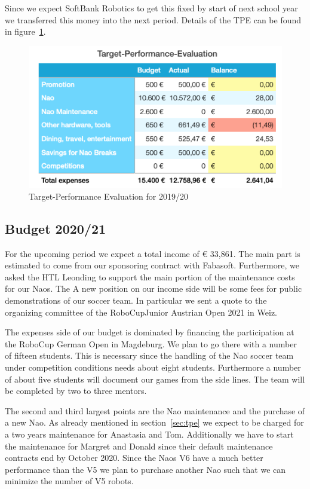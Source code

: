 \documentclass[11pt]{article}
\begin{document}
Since we expect SoftBank Robotics to get this fixed by start of next school year we transferred this money into the next period. Details of the TPE can be found in figure~\ref{fig:tpe}.
\begin{figure}
\begin{center}
\includegraphics[scale=0.5]{img/targetPerformanceEvaluation.png}
\end{center}
\caption{Target-Performance Evaluation for 2019/20}
\label{fig:tpe}
\end{figure}

\subsection{Budget 2020/21}\label{sec:budget}
For the upcoming period we expect a total income of € 33,861. The main part is estimated to come from our sponsoring contract with Fabasoft. Furthermore, we asked the HTL Leonding to support the main portion of the maintenance costs for our Naos. The A new position on our income side will be some fees for public demonstrations of our soccer team. In particular we sent a quote to the organizing committee of the RoboCupJunior Austrian Open 2021 in Weiz.

The expenses side of our budget is dominated by financing the participation at the RoboCup German Open in Magdeburg. We plan to go there with a number of fifteen students. This is necessary since the handling of the Nao soccer team under competition conditions needs about eight students. Furthermore a number of about five students will document our games from the side lines. The team will be completed by two to three mentors.

The second and third largest points are the Nao maintenance and the purchase of a new Nao. As already mentioned in section~\ref{sec:tpe} we expect to be charged for a two years maintenance for Anastasia and Tom. Additionally we have to start the maintenance for Margret and Donald since their default maintenance contracts end by October 2020. Since the Naos V6 have a much better performance than the V5 we plan to purchase another Nao such that we can minimize the number of V5 robots. 
\end{document}
